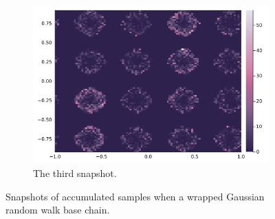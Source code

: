 \documentclass[]{article}
\theoremstyle{definition}
\begin{document}
\begin{figure}[H]
\begin{subfigure}{0.3\textwidth}
            \end{subfigure}
            \hfill
            \begin{subfigure}{0.3\textwidth}
                \includegraphics[width=\textwidth]{gaussian_base(3).png}
                \caption{The third snapshot.}
            \end{subfigure}
            \caption{Snapshots of accumulated samples when a wrapped Gaussian random walk base chain.}
            \label{fig:gaussian_rand_bc}
        \end{figure}
\end{document}
